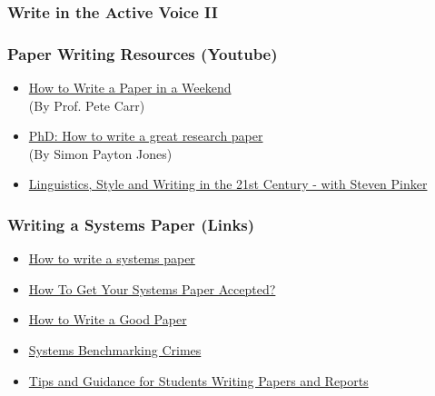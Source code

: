 \documentclass[hyperref={pdfpagelabels=false}, aspectratio=1610,handout]{beamer}
\begin{document}
\begin{frame}
\frametitle{Write in the Active Voice II}
\end{frame}

\begin{frame}
\frametitle{Paper Writing Resources (Youtube)}
\begin{block}{}
 \begin{itemize}
  \item \href{https://www.youtube.com/watch?v=UY7sVKJPTMA&feature=share}{How to Write a Paper in a Weekend}\\(By Prof. Pete Carr)
  \item \href{https://youtu.be/1AYxMbYZQ1Y}{PhD: How to write a great research paper}\\(By Simon Payton Jones)
  \item \href{https://youtu.be/OV5J6BfToSw}{Linguistics, Style and Writing in the 21st Century - with Steven Pinker}
 \end{itemize}
\end{block}
\end{frame}

\begin{frame}
\frametitle{Writing a Systems Paper (Links)}
\begin{block}{}
 \begin{itemize}
  \item \href{http://gramoli.redbellyblockchain.io/web/doc/talks/researchmethod.pdf}{How to write a systems paper}
  \item  \href{https://www.doc.ic.ac.uk/~prp/doc/talks/11-prp-paper_writing.pdf}{How To Get Your Systems Paper Accepted?}
  \item \href{http://www.cse.unsw.edu.au/~gernot/talk-howto-paper.pdf}{How to Write a Good Paper}
  \item  \href{http://www.cse.unsw.edu.au/~gernot/benchmarking-crimes.html}{Systems Benchmarking Crimes}
  \item \href{http://www.cse.unsw.edu.au/~gernot/style-guide.html}{Tips and Guidance for Students Writing Papers and Reports}
 \end{itemize}
\end{block}
\end{frame}
\end{document}
